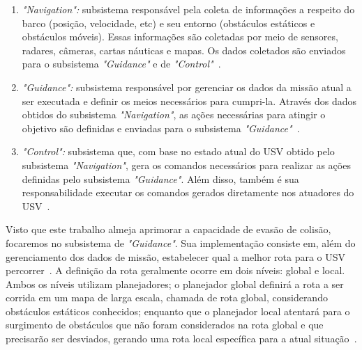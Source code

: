         \begin{enumerate}
            \item \textit{"Navigation":} subsistema responsável pela coleta de informações a respeito do barco (posição, velocidade, etc) e seu entorno (obstáculos estáticos e obstáculos móveis). Essas informações são coletadas por meio de sensores, radares, câmeras, cartas náuticas e mapas. Os dados coletados são enviados para o subsistema \textit{"Guidance"} e de \textit{"Control"}~\cite{JURAK2020}.
            
            \item \textit{"Guidance":} subsistema responsável por gerenciar os dados da missão atual a ser executada e definir os meios necessários para cumpri-la. Através dos dados obtidos do subsistema \textit{"Navigation"}, as ações necessárias para atingir o objetivo são definidas e enviadas para o subsistema \textit{"Guidance"}~\cite{JURAK2020}.
            
            \item \textit{"Control":} subsistema que, com base no estado atual do USV obtido pelo subsistema \textit{"Navigation"}, gera os comandos necessários para realizar as ações definidas pelo subsistema \textit{"Guidance"}. Além disso, também é sua responsabilidade executar os comandos gerados diretamente nos atuadores do USV~\cite{JURAK2020}.
        \end{enumerate}
        
        Visto que este trabalho almeja aprimorar a capacidade de evasão de colisão, focaremos no subsistema de \textit{"Guidance"}. Sua implementação consiste em, além do gerenciamento dos dados de missão, estabelecer qual a melhor rota para o USV percorrer~\cite{JURAK2020}. A definição da rota geralmente ocorre em dois níveis: global e local. Ambos os níveis utilizam planejadores; o planejador global definirá a rota a ser corrida em um mapa de larga escala, chamada de rota global, considerando obstáculos estáticos conhecidos; enquanto que o planejador local atentará para o surgimento de obstáculos que não foram considerados na rota global e que precisarão ser desviados, gerando uma rota local específica para a atual situação~\cite{LIU201671}.
    
